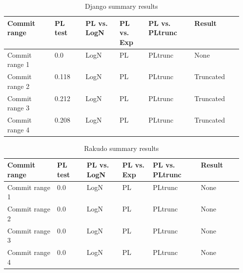 \documentclass[conference]{IEEEtran}
\begin{document}
\begin{table}[h!tbp]
  \caption{Django summary results}
  \begin{center}
    \begin{tabular}{| p{0.12\linewidth} | p{0.08\linewidth} | p{0.08\linewidth} |
        p{0.08\linewidth} | p{0.1\linewidth} | p{0.1\linewidth}
         |}
      \hline
      Commit range & PL test & PL vs. LogN & PL vs. Exp & PL vs. PLtrunc & Result \\
      \hline
      Commit range 1 & 0.0&  LogN & PL  &PLtrunc &  None\\
      Commit range 2 & 0.118& LogN & PL  &PLtrunc & Truncated \\
      Commit range 3 &  0.212&LogN & PL  &PLtrunc & Truncated \\
      Commit range 4 &  0.208&LogN & PL  &PLtrunc & Truncated \\
      \hline

      \hline
    \end{tabular}
  \end{center}
  \label{tab:2019testsdjango}
\end{table}


\begin{table}[h!tbp]
  \caption{Rakudo summary results}
  \begin{center}
    \begin{tabular}{| p{0.12\linewidth} | p{0.08\linewidth} | p{0.08\linewidth} |
        p{0.08\linewidth} | p{0.1\linewidth} | p{0.1\linewidth}
       |}
      \hline
      Commit range & PL test & PL vs. LogN & PL vs. Exp & PL vs. PLtrunc & Result \\
      \hline
      Commit range 1 & 0.0 & LogN & PL  &PLtrunc & None \\
      Commit range 2&  0.0& LogN & PL  &PLtrunc & None \\
      Commit range 3&  0.0& LogN & PL  &PLtrunc & None \\
      Commit range 4& 0.0  &  LogN & PL  &PLtrunc & None \\
      \hline

      \hline
    \end{tabular}
  \end{center}
  \label{tab:2019testsrakudo}
\end{table}
\end{document}

